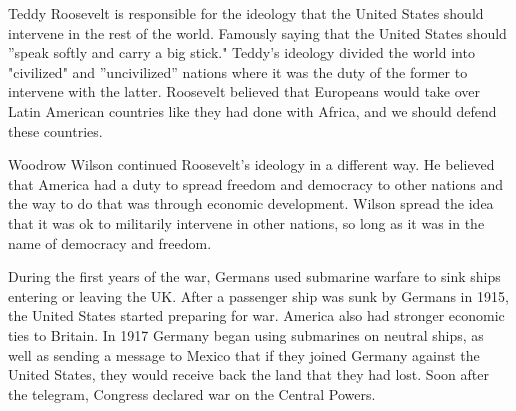 Teddy Roosevelt is responsible for the ideology that the United States should intervene in the rest of the world.
Famously saying that the United States should ''speak softly and carry a big stick."
Teddy's ideology divided the world into "civilized" and ''uncivilized'' nations where it was the duty of the former to intervene with the latter.
Roosevelt believed that Europeans would take over Latin American countries like they had done with Africa, and we should defend these countries.

Woodrow Wilson continued Roosevelt's ideology in a different way.
He believed that America had a duty to spread freedom and democracy to other nations and the way to do that was through economic development.
Wilson spread the idea that it was ok to militarily intervene in other nations, so long as it was in the name of democracy and freedom.

During the first years of the war, Germans used submarine warfare to sink ships entering or leaving the UK.
After a passenger ship was sunk by Germans in 1915, the United States started preparing for war.
America also had stronger economic ties to Britain.
In 1917 Germany began using submarines on neutral ships, as well as sending a message to Mexico that if they joined Germany against the United States, they would receive back the land that they had lost.
Soon after the telegram, Congress declared war on the Central Powers.